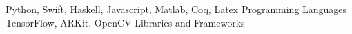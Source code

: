 \begin{cventries}
  \cvsmallentry
    {Python, Swift, Haskell, Javascript, Matlab, Coq, Latex}
    {Programming Languages}
    {}
    {}
    {}
  \cvsmallentry
    {TensorFlow, ARKit, OpenCV}
    {Libraries and Frameworks}
    {}
    {}
    {}
\end{cventries}


